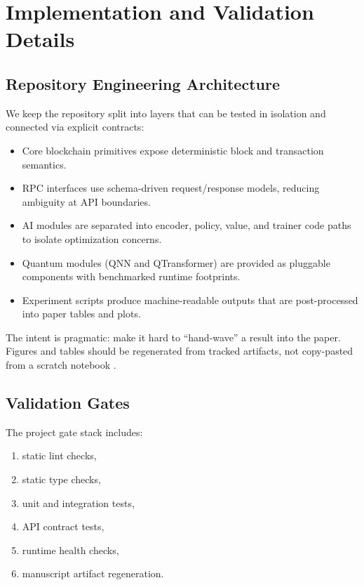 \section{Implementation and Validation Details}

\subsection{Repository Engineering Architecture}

We keep the repository split into layers that can be tested in isolation and connected via explicit contracts:
\begin{itemize}
  \item Core blockchain primitives expose deterministic block and transaction semantics.
  \item RPC interfaces use schema-driven request/response models, reducing ambiguity at API boundaries.
  \item AI modules are separated into encoder, policy, value, and trainer code paths to isolate optimization concerns.
  \item Quantum modules (QNN and QTransformer) are provided as pluggable components with benchmarked runtime footprints.
  \item Experiment scripts produce machine-readable outputs that are post-processed into paper tables and plots.
\end{itemize}

The intent is pragmatic: make it hard to ``hand-wave'' a result into the paper. Figures and tables should be regenerated from tracked artifacts, not copy-pasted from a scratch notebook \cite{wilson2017good,stodden2016enhancing}.

\subsection{Validation Gates}

The project gate stack includes:
\begin{enumerate}
  \item static lint checks,
  \item static type checks,
  \item unit and integration tests,
  \item API contract tests,
  \item runtime health checks,
  \item manuscript artifact regeneration.
\end{enumerate}

